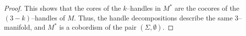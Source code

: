 \begin{proof}
	This shows that the cores of the $k$--handles in $M^*$ are the cocores of the $(3-k)$--handles of $M$.
	Thus, the handle decompositions describe the same 3--manifold, and $M^*$ is a cobordism of the pair $(\Sigma,\emptyset)$.		
\end{proof}



%
%	
%	
%	
